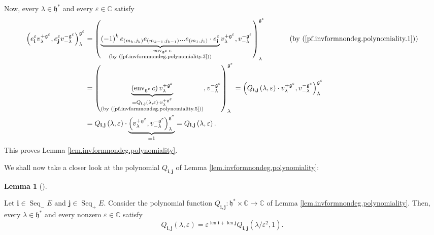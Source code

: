 \documentclass
[numbers=enddot,12pt,final,onecolumn,german,notitlepage]{scrartcl}%
\theoremstyle{definition}
\newtheorem{lem}[theo]{Lemma}
\newenvironment{lemma}[1][]
{\begin{lem}[#1]\begin{leftbar}}
{\end{leftbar}\end{lem}}
\begin{document}
Now, every $\lambda\in\mathfrak{h}^{\ast}$ and every $\varepsilon\in
\mathbb{C}$ satisfy%
\begin{align*}
\left(  e_{\mathbf{i}}^{\varepsilon}v_{\lambda}^{+\mathfrak{g}^{\varepsilon}%
},e_{\mathbf{j}}^{\varepsilon}v_{-\lambda}^{-\mathfrak{g}^{\varepsilon}%
}\right)  _{\lambda}^{\mathfrak{g}^{\varepsilon}}  &  =\left(
\underbrace{\left(  -1\right)  ^{k}e_{\left(  m_{k},j_{k}\right)  }e_{\left(
m_{k-1},j_{k-1}\right)  }...e_{\left(  m_{1},j_{1}\right)  }\cdot
e_{\mathbf{i}}^{\varepsilon}}_{\substack{=\operatorname*{env}%
\nolimits_{\mathfrak{g}^{\varepsilon}}c\\\text{(by
(\ref{pf.invformnondeg.polynomiality.3}))}}}v_{\lambda}^{+\mathfrak{g}%
^{\varepsilon}},v_{-\lambda}^{-\mathfrak{g}^{\varepsilon}}\right)  _{\lambda
}^{\mathfrak{g}^{\varepsilon}}\ \ \ \ \ \ \ \ \ \ \left(  \text{by
(\ref{pf.invformnondeg.polynomiality.1})}\right) \\
&  =\left(  \underbrace{\left(  \operatorname*{env}\nolimits_{\mathfrak{g}%
^{\varepsilon}}c\right)  v_{\lambda}^{+\mathfrak{g}^{\varepsilon}}%
}_{\substack{=Q_{\mathbf{i},\mathbf{j}}\left(  \lambda,\varepsilon\right)
\cdot v_{\lambda}^{+\mathfrak{g}^{\varepsilon}}\\\text{(by
(\ref{pf.invformnondeg.polynomiality.5}))}}},v_{-\lambda}^{-\mathfrak{g}%
^{\varepsilon}}\right)  _{\lambda}^{\mathfrak{g}^{\varepsilon}}=\left(
Q_{\mathbf{i},\mathbf{j}}\left(  \lambda,\varepsilon\right)  \cdot v_{\lambda
}^{+\mathfrak{g}^{\varepsilon}},v_{-\lambda}^{-\mathfrak{g}^{\varepsilon}%
}\right)  _{\lambda}^{\mathfrak{g}^{\varepsilon}}\\
&  =Q_{\mathbf{i},\mathbf{j}}\left(  \lambda,\varepsilon\right)
\cdot\underbrace{\left(  v_{\lambda}^{+\mathfrak{g}^{\varepsilon}}%
,v_{-\lambda}^{-\mathfrak{g}^{\varepsilon}}\right)  _{\lambda}^{\mathfrak{g}%
^{\varepsilon}}}_{=1}=Q_{\mathbf{i},\mathbf{j}}\left(  \lambda,\varepsilon
\right)  .
\end{align*}
This proves Lemma \ref{lem.invformnondeg.polynomiality}.

We shall now take a closer look at the polynomial $Q_{\mathbf{i},\mathbf{j}}$
of Lemma \ref{lem.invformnondeg.polynomiality}:

\begin{lemma}
\label{lem.invformnondeg.polynomiality3}Let $\mathbf{i}\in\operatorname*{Seq}%
\nolimits_{-}E$ and $\mathbf{j}\in\operatorname*{Seq}\nolimits_{+}E$. Consider
the polynomial function $Q_{\mathbf{i},\mathbf{j}}:\mathfrak{h}^{\ast}%
\times\mathbb{C}\rightarrow\mathbb{C}$ of Lemma
\ref{lem.invformnondeg.polynomiality}. Then, every $\lambda\in\mathfrak{h}%
^{\ast}$ and every nonzero $\varepsilon\in\mathbb{C}$ satisfy%
\[
Q_{\mathbf{i},\mathbf{j}}\left(  \lambda,\varepsilon\right)  =\varepsilon
^{\operatorname*{len}\mathbf{i}+\operatorname*{len}\mathbf{j}}Q_{\mathbf{i}%
,\mathbf{j}}\left(  \lambda/\varepsilon^{2},1\right)  .
\]

\end{lemma}
\end{document}
